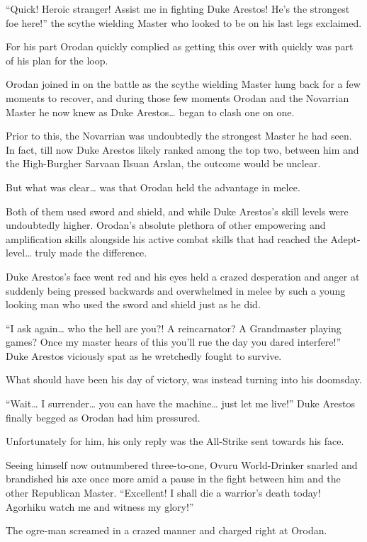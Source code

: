 \documentclass[a4paper,10pt]{book}
\begin{document}
“Quick! Heroic stranger! Assist me in fighting Duke Arestos! He’s the strongest foe here!” the scythe wielding Master who looked to be on his last legs exclaimed.\par
For his part Orodan quickly complied as getting this over with quickly was part of his plan for the loop.\par
Orodan joined in on the battle as the scythe wielding Master hung back for a few moments to recover, and during those few moments Orodan and the Novarrian Master he now knew as Duke Arestos… began to clash one on one.\par
Prior to this, the Novarrian was undoubtedly the strongest Master he had seen. In fact, till now Duke Arestos likely ranked among the top two, between him and the High-Burgher Sarvaan Ilsuan Arslan, the outcome would be unclear.\par
But what was clear… was that Orodan held the advantage in melee.\par
Both of them used sword and shield, and while Duke Arestos’s skill levels were undoubtedly higher. Orodan’s absolute plethora of other empowering and amplification skills alongside his active combat skills that had reached the Adept-level… truly made the difference.\par
Duke Arestos’s face went red and his eyes held a crazed desperation and anger at suddenly being pressed backwards and overwhelmed in melee by such a young looking man who used the sword and shield just as he did.\par
“I ask again… who the hell are you?! A reincarnator? A Grandmaster playing games? Once my master hears of this you’ll rue the day you dared interfere!” Duke Arestos viciously spat as he wretchedly fought to survive.\par
What should have been his day of victory, was instead turning into his doomsday.\par
“Wait… I surrender… you can have the machine… just let me live!” Duke Arestos finally begged as Orodan had him pressured.\par
Unfortunately for him, his only reply was the All-Strike sent towards his face.\par
Seeing himself now outnumbered three-to-one, Ovuru World-Drinker snarled and brandished his axe once more amid a pause in the fight between him and the other Republican Master. “Excellent! I shall die a warrior’s death today! Agorhiku watch me and witness my glory!”\par
The ogre-man screamed in a crazed manner and charged right at Orodan.\par
\end{document}
